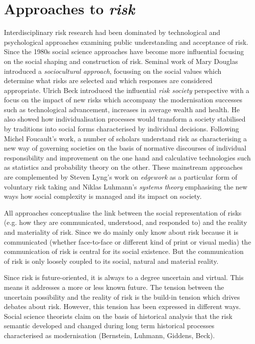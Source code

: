 \section{Approaches to \emph{risk}}

Interdisciplinary risk research had been dominated by technological and psychological approaches examining public understanding and acceptance of risk. Since the 1980s social science approaches have become more influential focusing on the social shaping and construction of risk. Seminal work of Mary Douglas introduced a \emph{sociocultural approach}, focussing on the social values which  determine what risks are selected and which responses are considered appropriate. Ulrich Beck introduced the influential \emph{risk society} perspective with a focus on the impact of new risks which accompany the modernisation successes such as technological advancement, increases in average wealth and health. He also showed how individualisation processes would transform a society stabilised by traditions into social forms characterised by individual decisions. Following Michel Foucault's work, a number of scholars understand risk as characterising a new way of governing societies on the basis of normative discourses of individual responsibility and improvement on the one hand and calculative technologies such as statistics and probability theory on the other. These mainstream approaches are complemented by Steven Lyng's work on \emph{edgework} as a particular form of voluntary risk taking and Niklas Luhmann's \emph{systems theory} emphasising the new ways how social complexity is managed and its impact on society.

All approaches conceptualise the link between the social representation of risks (e.g. how they are communicated, understood, and responded to) and the reality and materiality of risk. Since we do mainly only know about risk because it is communicated (whether face-to-face or different kind of print or visual media) the communication of risk is central for its social existence. But the communication of risk is only loosely coupled to its social, natural and material reality.

Since risk is future-oriented, it is always to a degree uncertain and virtual. This means it addresses a more or less known future. The tension between the uncertain possibility and the reality of risk is the build-in tension which drives debates about risk. However, this tension has been expressed in different ways. Social science theorists claim on the basis of historical analysis that the risk semantic developed and changed during long term historical processes characterised as modernisation (Bernstein, Luhmann, Giddens, Beck).

